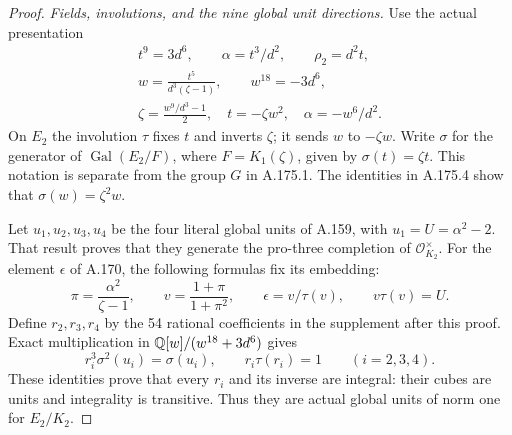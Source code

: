\begin{proof}
\emph{Fields, involutions, and the nine global unit directions.}
Use the actual presentation
\[
 \begin{gathered}
 t^9=3d^6,\qquad \alpha=t^3/d^2,\qquad \rho_2=d^2t,\\
 w=\frac{t^5}{d^3(\zeta-1)},\qquad w^{18}=-3d^6,\\
 \zeta=\frac{w^9/d^3-1}{2},\quad t=-\zeta w^2,\quad
 \alpha=-w^6/d^2.
 \end{gathered}
\tag{A.175.4}
\]
On $E_2$ the involution $\tau$ fixes $t$ and inverts $\zeta$;
it sends $w$ to $-\zeta w$.  Write $\sigma$ for the generator of
$\operatorname{Gal}(E_2/F)$, where $F=K_1(\zeta)$, given by
$\sigma(t)=\zeta t$.  This notation is separate from the group $G$
in A.175.1.  The identities in A.175.4 show that
$\sigma(w)=\zeta^2w$.

Let $u_1,u_2,u_3,u_4$ be the four literal global units of A.159,
with $u_1=U=\alpha^2-2$.  That result proves that they generate the
pro-three completion of $\mathcal O_{K_2}^{\times}$.
For the element $\epsilon$ of A.170, the following formulas fix its
embedding:
\[
 \pi=\frac{\alpha^2}{\zeta-1},\qquad
 v=\frac{1+\pi}{1+\pi^2},\qquad
 \epsilon=v/\tau(v),\qquad v\tau(v)=U.
\tag{A.175.5}
\]
Define $r_2,r_3,r_4$ by the 54 rational coefficients in the
supplement after this proof.  Exact multiplication in
$\mathbb Q[w]/(w^{18}+3d^6)$ gives
\[
 r_i^3\sigma^2(u_i)=\sigma(u_i),\qquad
 r_i\tau(r_i)=1\qquad(i=2,3,4).
\tag{A.175.6}
\]
These identities prove that every $r_i$ and its inverse are integral:
their cubes are units and integrality is transitive.  Thus they are
actual global units of norm one for $E_2/K_2$.


\end{proof}
